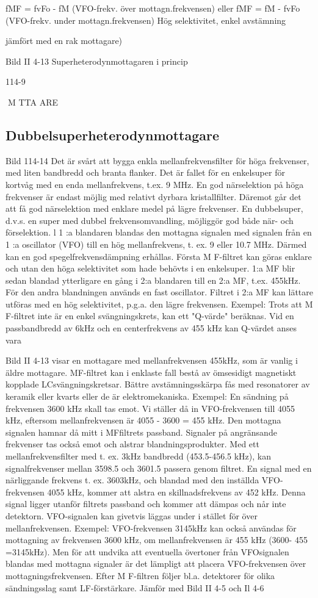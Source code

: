 fMF = fvFo - fM (VFO-frekv. över mottagn.frekvensen)
eller
fMF = fM - fvFo (VFO-frekv. under mottagn.frekvensen)
Hög selektivitet, enkel avstämning {jämfört med en rak mottagare)

Bild II 4-13 Superheterodynmottagaren i princip

114-9

M TTA ARE
\subsection{Dubbelsuperheterodynmottagare}
Bild 114-14
Det är svårt att bygga enkla mellanfrekvensfilter för höga frekvenser, med liten bandbredd och branta flanker. Det är fallet för en
enkelsuper för kortvåg med en enda mellanfrekvens, t.ex. 9 MHz.
En god närselektion på höga frekvenser
är endast möjlig med relativt dyrbara kristallfilter. Däremot går det att få god närselektion
med enklare medel på lägre frekvenser.
En dubbelsuper, d.v.s. en super med
dubbel frekvensomvandling, möjliggör god
både när- och förselektion. l 1 :a blandaren
blandas den mottagna signalen med signalen från en 1 :a oscillator (VFO) till en hög
mellanfrekvens, t. ex. 9 eller 10.7 MHz.
Därmed kan en god spegelfrekvensdämpning erhållas. Första M F-filtret kan göras enklare och utan den höga selektivitet
som hade behövts i en enkelsuper. 1:a MF
blir sedan blandad ytterligare en gång i 2:a
blandaren till en 2:a MF, t.ex. 455kHz. För
den andra blandningen används en fast
oscillator. Filtret i 2:a MF kan lättare utföras
med en hög selektivitet, p.g.a. den lägre
frekvensen.
Exempel:
Trots att M F-filtret inte är en enkel
svängningskrets, kan ett "Q-värde" beräknas. Vid en passbandbredd av 6kHz och en
centerfrekvens av 455 kHz kan Q-värdet
anses vara

Bild II 4-13 visar en mottagare med mellanfrekvensen 455kHz, som är vanlig i äldre
mottagare. MF-filtret kan i enklaste fall bestå av ömsesidigt magnetiskt kopplade LCsvängningskretsar. Bättre avstämningsskärpa fås med resonatorer av keramik eller
kvarts eller de är elektromekaniska.
Exempel:
En sändning på frekvensen 3600 kHz
skall tas emot. Vi ställer då in VFO-frekvensen till 4055 kHz, eftersom mellanfrekvensen är 4055 - 3600 = 455 kHz. Den
mottagna signalen hamnar då mitt i MFfiltrets passband.
Signaler på angränsande frekvenser tas
också emot och alstrar blandningsprodukter.
Med ett mellanfrekvensfilter med t. ex. 3kHz
bandbredd (453.5-456.5 kHz), kan signalfrekvenser mellan 3598.5 och 3601.5 passera genom filtret. En signal med en närliggande frekvens t. ex. 3603kHz, och blandad
med den inställda VFO-frekvensen 4055
kHz, kommer att alstra en skillnadsfrekvens
av 452 kHz. Denna signal ligger utanför
filtrets passband och kommer att dämpas
och når inte detektorn.
VFO-signalen kan givetvis läggas under
i stället för över mellanfrekvensen.
Exempel: VFO-frekvensen 3145kHz kan
också användas för mottagning av frekvensen 3600 kHz, om mellanfrekvensen är 455
kHz (3600- 455 =3145kHz). Men för att
undvika att eventuella övertoner från VFOsignalen blandas med mottagna signaler är
det lämpligt att placera VFO-frekvensen över
mottagningsfrekvensen.
Efter M F-filtren följer bl.a. detektorer för
olika sändningsslag samt LF-förstärkare.
Jämför med Bild II 4-5 och Il 4-6

}
